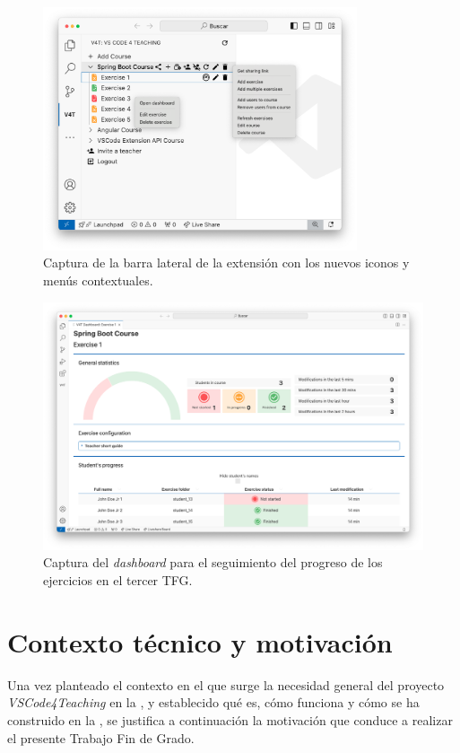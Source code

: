 \begin{figure}[ht!]
    \centering
    \includegraphics[width=0.825\textwidth]{imagenes/utilizadas/1-introduccion/historia-tfg3-gui.png}
    \caption{Captura de la barra lateral de la extensión con los nuevos iconos y menús contextuales.}
    \label{fig:historiaProyecto3GUI}
\end{figure}

\begin{figure}[ht!]
    \centering
    \includegraphics[width=\textwidth]{imagenes/utilizadas/1-introduccion/historia-tfg3-dashboard.png}
    \caption{Captura del \textit{dashboard} para el seguimiento del progreso de los ejercicios en el tercer TFG.}
    \label{fig:historiaProyecto3Dashboard}
\end{figure}

\section{Contexto técnico y motivación}
\label{sec:contxtTecnico}
Una vez planteado el contexto en el que surge la necesidad general del proyecto \textit{VSCode4Teaching} en la , y establecido qué es, cómo funciona y cómo se ha construido en la , se justifica a continuación la motivación que conduce a realizar el presente Trabajo Fin de Grado.

